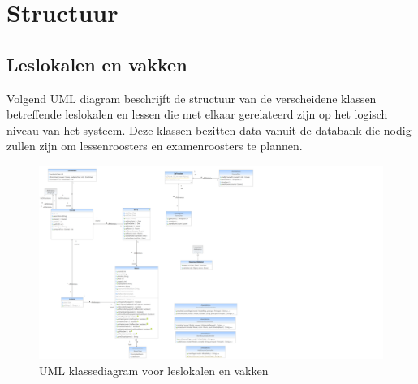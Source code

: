 \section{Structuur}
\subsection{Leslokalen en vakken}
Volgend UML diagram beschrijft de structuur van de verscheidene klassen betreffende leslokalen en lessen die met elkaar gerelateerd zijn op het logisch niveau van het systeem.
Deze klassen bezitten data vanuit de databank die nodig zullen zijn om lessenroosters en examenroosters te plannen.

\begin{figure}[H]
	\centering
	\includegraphics[scale=0.2]{img/roomsAndCourses}
	\caption{UML klassediagram voor leslokalen en vakken}
	\label{fig:roomsAndCourses}
\end{figure}